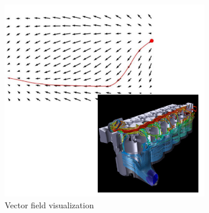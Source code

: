\begin{figure}[H]
    \centering
    \includegraphics[width=0.8\textwidth]{images/VectorField.png} 
    \caption{Vector field visualization}
    \label{fig:immagine}
\end{figure}
